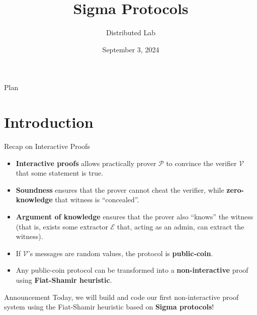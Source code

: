 \documentclass{zkdl-presentation-template}
\title[Sigma Protocols]{\textbf{Sigma Protocols}}
\author{Distributed Lab}
\date{September 3, 2024}
\begin{document}
 
	\begin{frame}{Plan}
        \tableofcontents
    \end{frame}

	\section{Introduction}


    \begin{frame}{Recap on Interactive Proofs}
        \begin{itemize}
            \item \textbf{Interactive proofs} allows practically prover $\mathcal{P}$ to convince the verifier $\mathcal{V}$ that some statement is true.
            \item \textbf{Soundness} ensures that the prover cannot cheat the verifier, while \textbf{zero-knowledge} that witness is ``concealed''.
            \item \textbf{Argument of knowledge} ensures that the prover also ``knows'' the witness (that is, exists some extractor $\mathcal{E}$ that, acting as an admin, can extract the witness).
            \item If $\mathcal{V}$'s messages are random values, the protocol is \textbf{public-coin}.
            \item Any public-coin protocol can be transformed into a \textbf{non-interactive} proof using \textbf{Fiat-Shamir heuristic}.
        \end{itemize}

        \begin{alertblock}{Announcement}
            Today, we will build and code our first non-interactive proof system using the Fiat-Shamir heuristic based on \textbf{Sigma protocols}!
        \end{alertblock}
    \end{frame}
\end{document}
